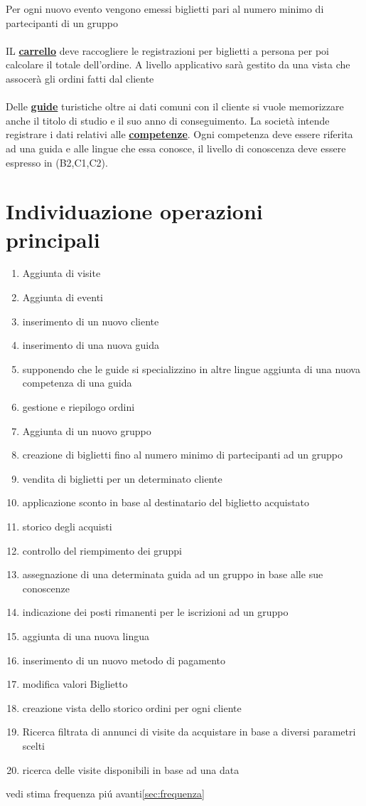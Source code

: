 \documentclass[a4paper,12pt]{report}
\begin{document}
Per ogni nuovo evento vengono emessi biglietti pari al numero minimo di partecipanti di un gruppo\\\\
IL \textbf{\underline{carrello}} deve raccogliere le registrazioni per biglietti a persona per poi calcolare
il totale dell'ordine. A livello applicativo sarà gestito da una vista che assocerà gli ordini fatti dal cliente \\\\
Delle \textbf{\underline{guide}} turistiche oltre ai dati comuni con il cliente si vuole memorizzare
anche il titolo di studio e il suo anno di conseguimento. La società intende registrare i dati relativi
alle \textbf{\underline{competenze}}. Ogni competenza deve essere riferita ad una guida e alle lingue che essa conosce,
il livello di conoscenza deve essere espresso in (B2,C1,C2).

\section*{Individuazione operazioni principali}\label{sec:operazioni}
\begin{enumerate}
	\item Aggiunta di visite
	\item Aggiunta di eventi
	\item inserimento di un nuovo cliente
	\item inserimento di una nuova guida
	\item supponendo che le guide si specializzino in altre lingue aggiunta di una nuova competenza di una guida
	\item gestione e riepilogo ordini
	\item Aggiunta di un nuovo gruppo
	\item creazione di biglietti fino al numero minimo di partecipanti ad un gruppo
	\item vendita di biglietti per un determinato cliente
	\item applicazione sconto in base al destinatario del biglietto acquistato
	\item storico degli acquisti
	\item controllo del riempimento dei gruppi
	\item assegnazione di una determinata guida ad un gruppo in base alle sue conoscenze
	\item indicazione dei posti rimanenti per le iscrizioni ad un gruppo
	\item aggiunta di una nuova lingua
	\item inserimento di un nuovo metodo di pagamento
	\item modifica valori Biglietto
	\item creazione vista dello storico ordini per ogni cliente
	\item Ricerca filtrata di annunci di visite da
	      acquistare in base a diversi parametri scelti
	\item ricerca delle visite disponibili in base ad una data
\end{enumerate}
vedi stima frequenza piú avanti\ref{sec:frequenza}
\newpage
\end{document}
